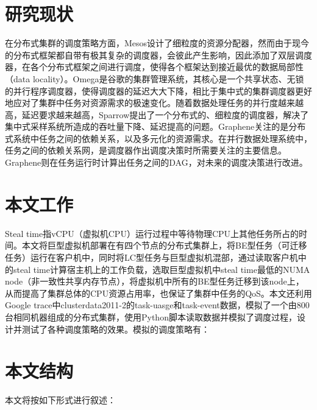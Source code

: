 \section{研究现状}
\label{chap:dissch}
在分布式集群的调度策略方面，Mesos\cite{mesos}设计了细粒度的资源分配器，然而由于现今的分布式框架都自带有极其复杂的调度器，会彼此产生影响，因此添加了双层调度器，在各个分布式框架之间进行调度，使得各个框架达到接近最优的数据局部性（data locality）。Omega\cite{omega}是谷歌的集群管理系统，其核心是一个共享状态、无锁的并行程序调度器，使得调度器的延迟大大下降，相比于集中式的集群调度器更好地应对了集群中任务对资源需求的极速变化。随着数据处理任务的并行度越来越高，延迟要求越来越高，Sparrow\cite{sparrow}提出了一个分布式的、细粒度的调度器，解决了集中式采样系统所造成的吞吐量下降、延迟提高的问题。Graphene\cite{graphene}关注的是分布式系统中任务之间的依赖关系，以及多元化的资源需求。在并行数据处理系统中，任务之间的依赖关系网，是调度器作出调度决策时所需要关注的主要信息。Graphene则在任务运行时计算出任务之间的DAG，对未来的调度决策进行改进。

\section{本文工作}
Steal time指vCPU（虚拟机CPU）运行过程中等待物理CPU上其他任务所占的时间。本文将巨型虚拟机部署在有四个节点的分布式集群上，将BE型任务（可迁移任务）运行在客户机中，同时将LC型任务与巨型虚拟机混部，通过读取客户机中的steal time计算宿主机上的工作负载，选取巨型虚拟机中steal time最低的NUMA node（非一致性共享内存节点），将虚拟机中所有的BE型任务迁移到该node上，从而提高了集群总体的CPU资源占用率，也保证了集群中任务的QoS。本文还利用Google trace中clusterdata2011-2的task-uasge和task-event数据，模拟了一个由800台相同机器组成的分布式集群，使用Python脚本读取数据并模拟了调度过程，设计并测试了各种调度策略的效果。模拟的调度策略有：


\section{本文结构}
本文将按如下形式进行叙述：
